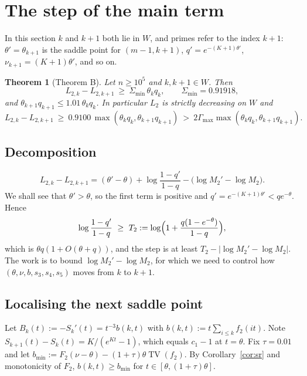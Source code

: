 \documentclass[11pt]{amsart}
\newtheorem{theorem}{Theorem}[section]
\theoremstyle{definition}
\theoremstyle{remark}
\numberwithin{equation}{section}
\newcommand{\TV}{\operatorname{TV}}
\begin{document}
\section{The step of the main term}\label{sec:B}

In this section $k$ and $k+1$ both lie in $W$, and primes refer to the index $k+1$: $\theta'=\theta_{k+1}$ is the saddle point for
$(m-1,k+1)$, $q'=e^{-(K+1)\theta'}$, $\nu_{k+1}=(K+1)\theta'$, and so on.

\begin{theorem}[Theorem B]\label{thm:B}
Let $n\ge10^5$ and $k,k+1\in W$. Then
\[
  L_{2,k}-L_{2,k+1}\ \ge\ \Sigma_{\min}\,\theta_kq_k,\qquad \Sigma_{\min}=0.91918,
\]
and $\theta_{k+1}q_{k+1}\le1.01\,\theta_kq_k$. In particular $L_2$ is strictly decreasing on $W$ and
\[
  L_{2,k}-L_{2,k+1}\ \ge\ 0.9100\,\max(\theta_kq_k,\theta_{k+1}q_{k+1})\ >\ 2\Gamma_{\max}\max(\theta_kq_k,\theta_{k+1}q_{k+1}) .
\]
\end{theorem}

\subsection{Decomposition}
\begin{equation}\label{eq:stepdec}
  L_{2,k}-L_{2,k+1}=(\theta'-\theta)+\log\frac{1-q'}{1-q}-\bigl(\log M_2'-\log M_2\bigr).
\end{equation}
We shall see that $\theta'>\theta$, so the first term is positive and $q'=e^{-(K+1)\theta'}<qe^{-\theta}$. Hence
\[
  \log\frac{1-q'}{1-q}\ \ge\ T_2:=\log\Bigl(1+\frac{q(1-e^{-\theta})}{1-q}\Bigr),
\]
which is $\theta q(1+O(\theta+q))$, and the step is at least $T_2-|\log M_2'-\log M_2|$. The work is to bound $\log M_2'-\log M_2$, for which we
need to control how $(\theta,\nu,b,s_3,s_4,s_5)$ moves from $k$ to $k+1$.

\subsection{Localising the next saddle point}
Let $B_k(t):=-S_k'(t)=t^{-3}b(k,t)$ with $b(k,t):=t\sum_{i\le k}f_2(it)$. Note $S_{k+1}(t)-S_k(t)=K/(e^{Kt}-1)$, which equals $c_1-1$
at $t=\theta$. Fix $\tau=0.01$ and let $b_{\min}:=F_2(\nu-\theta)-(1+\tau)\theta\TV(f_2)$. By Corollary~\ref{cor:sr} and monotonicity of
$F_2$, $b(k,t)\ge b_{\min}$ for $t\in[\theta,(1+\tau)\theta]$.
\end{document}
